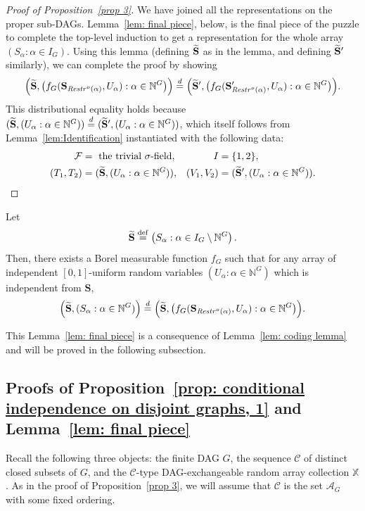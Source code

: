\documentclass[AHL,Unicode,longabstracts,published]{cedram}
\newcommand{\alf}{\alpha}%
\newcommand*{\defeq}{\stackrel{\mathrm{def}}{=}}
\renewcommand{\t}{\tilde}
\renewcommand{\d}{\buildrel{d}\over{=}}
\newcommand*\srstr{\mathit{Restr}^o}
\newcommand*\X{\mathbb{X}}
\newcommand*\N{\mathbb{N}}
\renewcommand{\AA}{\mathcal{A}}
\newcommand*\CC{{\mathcal{C}}}
\newcommand*\FF{\mathcal{F}}
\newcommand*\bS{\mathbf{S}}
\let\oldtilde\tilde
\renewcommand*{\tilde}[1]{\mathchoice{\widetilde{#1}}{\widetilde{#1}}{\oldtilde{#1}}{\oldtilde{#1}}}
\newcommand*\N{\mathbb{N}}
\begin{document}
\begin{proof}[Proof of Proposition~\ref{prop 3}]
We have joined all the representations on the proper sub-DAGs. Lemma~\ref{lem: final piece}, below, is the final piece of the puzzle to complete the top-level induction to get a representation for the whole array $(S_\alf : \alf \in I_G)$. Using this lemma (defining $\t\bS$ as in the lemma, and defining $\t\bS'$ similarly), we can complete the proof by showing
\[
\Big(\t\bS, \big(f_G(\bS_{\srstr(\alf)}, U_\alf):\alf \in \N^G\big)\Big)
\d
\Big(\t\bS', \big(f_G(\bS'_{\srstr(\alf)}, U_\alf):\alf \in \N^G\big)\Big).
\]
This distributional equality holds because $(\t\bS,(U_\alf:\alf\in \N^G)) \d (\t\bS',(U_\alf:\alf\in \N^G))$, which itself follows from Lemma~\ref{lem:Identification} instantiated with the following data:
\begin{align*}
\FF & = \text{ the trivial $\sigma$-field}, & I & =\{1,2\},
\\
(T_1,T_2) & = (\t\bS,(U_\alf:\alf\in \N^G)), & (V_1,V_2) & =(\t\bS',(U_\alf:\alf\in \N^G)).\qedhere
\end{align*}
\end{proof}
\goodbreak
\begin{lemm}\label{lem: final piece}
Let
\[
\t\bS
\defeq\left(S_\alf :\alf \in I_G \setminus \N^G\right).
\]
Then, there exists a Borel measurable function $f_G$ such that for any array of independent $[0,1]$-uniform random variables $(U_\alf: \alf\in \N^G)$ which is independent from $\bS$,
\begin{equation}\label{equation: final joint}
\Big(\t\bS, (S_\alf:\alf \in \N^G)\Big) \d \Big(\t\bS, \big(f_G(\bS_{\srstr(\alf)}, U_\alf):\alf \in \N^G\big)\Big).
\end{equation}
\end{lemm}

This Lemma~\ref{lem: final piece} is a consequence of Lemma~\ref{lem: coding lemma} and will be proved in the following subsection.


\subsection{Proofs of Proposition~\ref{prop: conditional independence on disjoint graphs, 1} and Lemma~\ref{lem: final piece}}\label{subsection: proof}
{Recall the following three objects: the finite DAG $G$, the sequence $\CC$ of distinct closed subsets of $G$, and the $\CC$-type DAG-exchangeable random array collection $\X$. As in the proof of Proposition~\ref{prop 3}, we will assume that $\CC$ is the set $\AA_G$ with some fixed ordering.}
\end{document}
